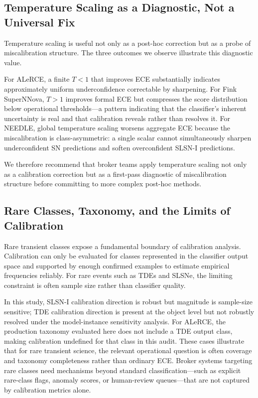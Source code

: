 \documentclass[twocolumn]{aastex631}
\begin{document}
\subsection{Temperature Scaling as a Diagnostic, Not a Universal
Fix}\label{sec:disc_tempscaling}

Temperature scaling is useful not only as a post-hoc correction
but as a probe of miscalibration structure. The three outcomes
we observe illustrate this diagnostic value.

For ALeRCE, a finite $T < 1$ that improves ECE substantially
indicates approximately uniform underconfidence correctable by
sharpening. For Fink SuperNNova, $T > 1$ improves formal ECE
but compresses the score distribution below operational
thresholds---a pattern indicating that the classifier's inherent
uncertainty is real and that calibration reveals rather than
resolves it. For NEEDLE, global temperature scaling worsens
aggregate ECE because the miscalibration is class-asymmetric:
a single scalar cannot simultaneously sharpen underconfident SN
predictions and soften overconfident SLSN-I predictions.

We therefore recommend that broker teams apply temperature
scaling not only as a calibration correction but as a
first-pass diagnostic of miscalibration structure before
committing to more complex post-hoc methods.

\subsection{Rare Classes, Taxonomy, and the Limits of
Calibration}\label{sec:disc_rare}

Rare transient classes expose a fundamental boundary of
calibration analysis. Calibration can only be evaluated for
classes represented in the classifier output space and supported
by enough confirmed examples to estimate empirical frequencies
reliably. For rare events such as TDEs and SLSNe, the limiting
constraint is often sample size rather than classifier quality.

In this study, SLSN-I calibration direction is robust but
magnitude is sample-size sensitive; TDE calibration direction is
present at the object level but not robustly resolved under the
model-instance sensitivity analysis. For ALeRCE, the production
taxonomy evaluated here does not include a TDE output class,
making calibration undefined for that class in this audit. These
cases illustrate that for rare transient science, the relevant
operational question is often coverage and taxonomy completeness
rather than ordinary ECE. Broker systems targeting rare classes
need mechanisms beyond standard classification---such as explicit
rare-class flags, anomaly scores, or human-review queues---that
are not captured by calibration metrics alone.
\end{document}
